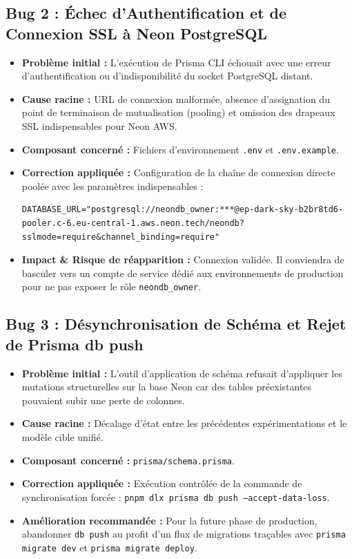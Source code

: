 \documentclass[11pt,a4paper]{article}
\begin{document}
\subsection{Bug 2 : Échec d'Authentification et de Connexion SSL à Neon PostgreSQL}
\begin{itemize}
    \item \textbf{Problème initial :} L'exécution de Prisma CLI échouait avec une erreur d'authentification ou d'indisponibilité du socket PostgreSQL distant.
    \item \textbf{Cause racine :} URL de connexion malformée, absence d'assignation du point de terminaison de mutualisation (pooling) et omission des drapeaux SSL indispensables pour Neon AWS.
    \item \textbf{Composant concerné :} Fichiers d'environnement \texttt{.env} et \texttt{.env.example}.
    \item \textbf{Correction appliquée :} Configuration de la chaîne de connexion directe poolée avec les paramètres indispensables :
\begin{lstlisting}
DATABASE_URL="postgresql://neondb_owner:***@ep-dark-sky-b2br8td6-pooler.c-6.eu-central-1.aws.neon.tech/neondb?sslmode=require&channel_binding=require"
\end{lstlisting}
    \item \textbf{Impact \& Risque de réapparition :} Connexion validée. Il conviendra de basculer vers un compte de service dédié aux environnements de production pour ne pas exposer le rôle \texttt{neondb\_owner}.
\end{itemize}

\subsection{Bug 3 : Désynchronisation de Schéma et Rejet de Prisma db push}
\begin{itemize}
    \item \textbf{Problème initial :} L'outil d'application de schéma refusait d'appliquer les mutations structurelles sur la base Neon car des tables préexistantes pouvaient subir une perte de colonnes.
    \item \textbf{Cause racine :} Décalage d'état entre les précédentes expérimentations et le modèle cible unifié.
    \item \textbf{Composant concerné :} \texttt{prisma/schema.prisma}.
    \item \textbf{Correction appliquée :} Exécution contrôlée de la commande de synchronisation forcée :
    \texttt{pnpm dlx prisma db push --accept-data-loss}.
    \item \textbf{Amélioration recommandée :} Pour la future phase de production, abandonner \texttt{db push} au profit d'un flux de migrations traçables avec \texttt{prisma migrate dev} et \texttt{prisma migrate deploy}.
\end{itemize}
\end{document}

